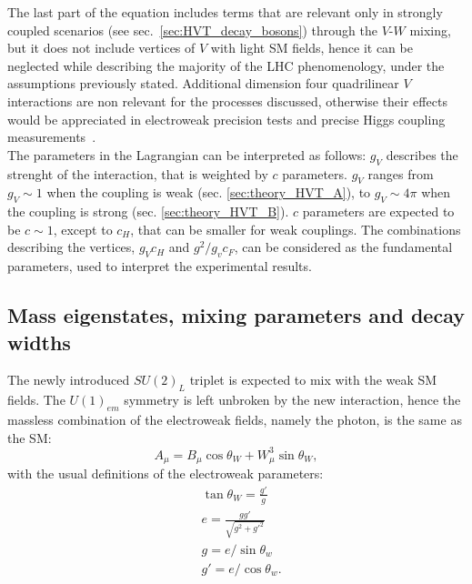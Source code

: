 The last part of the equation includes terms that are relevant only in strongly coupled scenarios (see sec.~\ref{sec:HVT_decay_bosons}) through the $V$-$W$ mixing, but it does not include vertices of $V$ with light SM fields, hence it can be neglected while describing the majority of the LHC phenomenology, under the assumptions previously stated. Additional dimension four quadrilinear $V$ interactions are non relevant for the processes discussed, otherwise their effects would be appreciated in electroweak precision tests and precise Higgs coupling measurements~\cite{Giudice:2007fh}.\\

The parameters in the Lagrangian can be interpreted as follows: $g_V$ describes the strenght of the interaction, that is weighted by $c$ parameters. $g_V$ ranges from $g_V \sim 1$ when the coupling is weak (sec. \ref{sec:theory_HVT_A}), to $g_V \sim 4 \pi$ when the coupling is strong (sec. \ref{sec:theory_HVT_B}). $c$ parameters are expected to be $c \sim 1$, except to $c_H$, that can be smaller for weak couplings. The combinations describing the vertices, $g_V c_H$ and $g^2/g_v c_F$, can be considered as the fundamental parameters, used to interpret the experimental results.

\subsection{Mass eigenstates, mixing parameters and decay widths}
\label{sec:HVT_pheno}

The newly introduced $SU(2)_L$ triplet is expected to mix with the weak SM fields. The $U(1)_{em}$ symmetry is left unbroken by the new interaction, hence the massless combination of the electroweak fields, namely the photon, is the same as the SM:
\begin{equation}
A_{\mu} = B_{\mu} \cos{\theta_W} + W_{\mu}^3 \sin{\theta_W},
\label{eq:A_mu}
\end{equation} 
with the usual definitions of the electroweak parameters:
\begin{equation}
\begin{split}
 & \tan{\theta_W}=\frac{g'}{g} \\
 & e = \frac{g g'}{\sqrt{g^2 + {g'}^2}} \\
 & g = e/\sin{\theta_w}\\
 & g' = e/\cos{\theta_w}.\\
\end{split}
\label{eq:ewk_param}
\end{equation}

